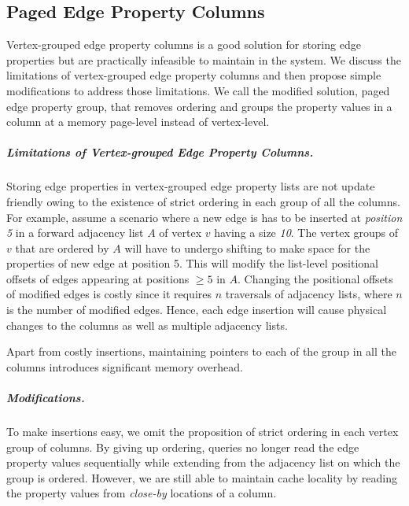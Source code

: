 \subsection{Paged Edge Property Columns}
\label{sec:paged-edge-property-columns}

Vertex-grouped edge property columns is a good solution for storing edge properties but are practically infeasible to maintain in the system. We discuss the limitations of vertex-grouped edge property columns and then propose simple modifications to address those limitations. We call the modified solution, paged edge property group, that removes ordering and groups the property values in a column at a memory page-level instead of vertex-level.

\vspace{-12pt}
\subparagraph{Limitations of Vertex-grouped Edge Property Columns.}
Storing edge properties in vertex-grouped edge property lists are not update friendly owing to the existence of strict ordering in each group of all the columns. For example, assume a scenario where a new edge is has to be inserted at \emph{position 5} in a forward adjacency list $A$ of vertex $v$ having a size \emph{10}. The vertex groups of $v$ that are ordered by $A$ will have to undergo shifting to make space for the properties of new edge at position 5. This will modify the list-level positional offsets of edges appearing at positions $\geq 5$ in $A$. Changing the positional offsets of modified edges is costly since it requires $n$ traversals of adjacency lists, where $n$ is the number of modified edges. Hence, each edge insertion will cause physical changes to the columns as well as multiple adjacency lists.

Apart from costly insertions, maintaining pointers to each of the group in all the columns introduces significant memory overhead. 

\vspace{-16pt}
\subparagraph{Modifications.}
To make insertions easy, we omit the proposition of strict ordering in each vertex group of columns. By giving up ordering, queries no longer read the edge property values sequentially while extending from the adjacency list on which the group is ordered. However, we are still able to maintain cache locality by reading the property values from \emph{close-by} locations of a column.

